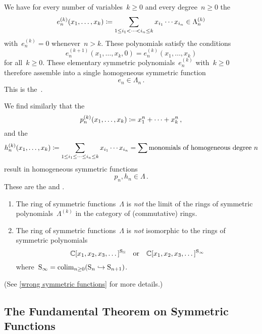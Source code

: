 \documentclass[a4paper,11pt]{scrartcl}
\begin{document}
\begin{example}
  We have for every number of variables~$k \geq 0$ and every degree~$n \geq 0$ the 
  \[
    e^{(k)}_n(x_1, \dotsc, x_k)
    \coloneqq
    \sum_{1 \leq i_1 < \dotsb < i_n \leq k}
    x_{i_1} \dotsm x_{i_n}
    \in
    \Lambda^{(k)}_n
  \]
  with~$e^{(k)}_n = 0$ whenever~$n > k$.
  These polynomials satisfy the conditions
  \[
    e^{(k+1)}_n(x_1, \dotsc, x_k, 0)
    =
    e^{(k)}_n(x_1, \dotsc, x_k)
  \]
  for all~$k \geq 0$.
  These elementary symmetric polynomials~$e^{(k)}_n$ with~$k \geq 0$ therefore assemble into a single homogeneous symmetric function
  \[
    e_n \in \Lambda_n \,.
  \]
  This is the~. 

  We find similarly that the 
  \[
    p^{(k)}_n(x_1, \dotsc, x_k)
    \coloneqq
    x_1^n + \dotsb + x_k^n \,,
  \]
  and the 
  \[
    h^{(k)}_n(x_1, \dotsc, x_k)
    \coloneqq
    \sum_{1 \leq i_1 \leq \dotsb \leq i_n \leq k}
    x_{i_1} \dotsm x_{i_n}
    =
    \sum \text{monomials of homogeneous degree~$n$}
  \]
  result in homogeneous symmetric functions
  \[
    p_n, h_n \in \Lambda \,.
  \]
  These are the  and .
\end{example}


\begin{warning}
  \leavevmode
  \begin{enumerate}
    \item
      The ring of symmetric functions~$\Lambda$ is \emph{not} the limit of the rings of symmetric polynomials~$\Lambda^{(k)}$ in the category of (commutative) rings.
    \item
      The ring of symmetric functions~$\Lambda$ is \emph{not} isomorphic to the rings of symmetric polynomials
      \[
        \mathbb{C}[x_1, x_2, x_3, \dotsc]^{\mathrm{S}_{\mathbb{N}}}
        \quad\text{or}\quad
        \mathbb{C}[x_1, x_2, x_3, \dotsc]^{\mathrm{S}_\infty}
      \]
      where~$\mathrm{S}_\infty = \operatorname*{colim}_{n \geq 0} (\mathrm{S}_n \hookrightarrow \mathrm{S}_{n+1})$.
  \end{enumerate}
  (See \cref{wrong symmetric functions} for more details.)
\end{warning}



\subsection{The Fundamental Theorem on Symmetric Functions}
\end{document}
